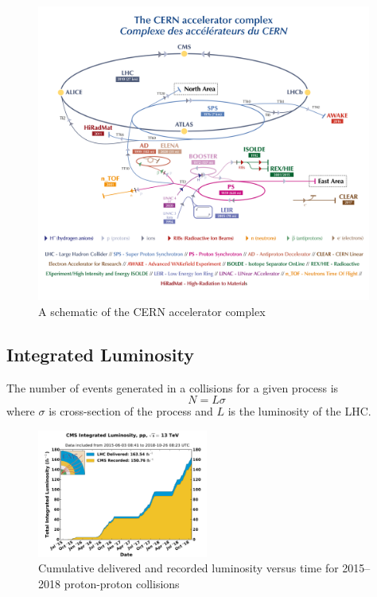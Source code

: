 \begin{figure}[!ht]
  \centering
  \includegraphics[width=0.98\textwidth]{figures/lhc-scheme.png}
  \caption[A schematic of the CERN accelerator complex]%
  {A schematic of the CERN accelerator complex~\cite{image-lhc-scheme}}%
  \label{fig:lhc}
\end{figure}

\subsection{
  Integrated Luminosity
}\label{ch_cms:cms-lumi}

The number of events generated in a collisions for a given process is
\begin{equation}
  N = L \sigma
\end{equation}
where \(\sigma \) is cross-section of the process
and \(L\) is the luminosity of the \gls{LHC}.

\begin{figure}[!ht]
  \centering
  \includegraphics[width=0.5\textwidth]{figures/int_lumi_pp_run2.pdf}
  \caption[Cumulative delivered and recorded luminosity versus
    time for 2015--2018 proton-proton collisions]%
  {Cumulative delivered and recorded luminosity versus
    time for 2015--2018 proton-proton collisions~\cite{plot-cms-lumi}}%
  \label{fig:int-lumi}
\end{figure}

